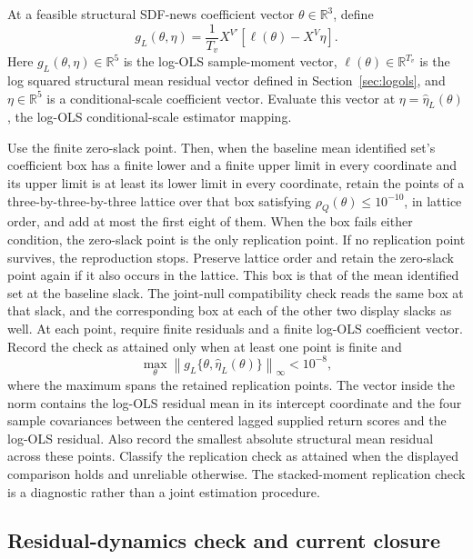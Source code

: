 \documentclass[11pt]{article}
\begin{document}
At a feasible structural SDF-news coefficient vector \(\theta\in\mathbb R^3\), define
\begin{equation*}
 g_L(\theta,\eta)=\frac{1}{T_v}X^{V\prime}
 \left[\ell(\theta)-X^V\eta\right].
\end{equation*}
Here \(g_L(\theta,\eta)\in\mathbb R^5\) is the log-OLS sample-moment vector,
\(\ell(\theta)\in\mathbb R^{T_v}\) is the log squared structural mean residual vector defined in
Section~\ref{sec:logols}, and \(\eta\in\mathbb R^5\) is a conditional-scale coefficient vector.
Evaluate this vector at \(\eta=\widehat\eta_L(\theta)\), the log-OLS conditional-scale estimator mapping.

Use the finite zero-slack point. Then, when the baseline mean identified set's coefficient box has a
finite lower and a finite upper limit in every coordinate and its upper limit is at least its lower
limit in every coordinate, retain the points of a three-by-three-by-three lattice over that box
satisfying \(\rho_Q(\theta)\le10^{-10}\), in lattice order, and add at most the first eight of
them. When the box fails
either condition, the zero-slack point is the only replication point. If no replication point
survives, the reproduction stops. Preserve lattice order and
retain the zero-slack point again if it also occurs in the lattice. This box is that of the mean
identified set at the baseline slack. The joint-null compatibility check reads the same box at that
slack, and the corresponding box at each of the other two display slacks as well. At
each point, require finite residuals and a finite log-OLS coefficient vector. Record the check as
attained only when at least one point is finite and
\begin{equation*}
 \max_{\theta}\left\|g_L\{\theta,\widehat\eta_L(\theta)\}\right\|_\infty<10^{-8},
\end{equation*}
where the maximum spans the retained replication points. The vector inside the norm contains the
log-OLS residual mean in its intercept coordinate and the four sample covariances between the
centered lagged supplied return scores and the log-OLS residual. Also record the smallest absolute
structural mean residual across these points. Classify the replication check as attained when the
displayed comparison holds and unreliable otherwise. The
stacked-moment replication check is a diagnostic rather than a joint estimation procedure.

\subsection{Residual-dynamics check and current closure}
\end{document}

